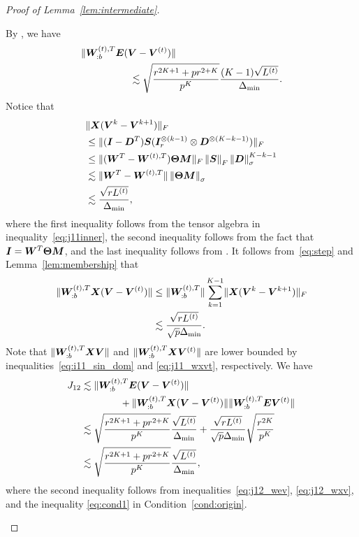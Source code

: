 \documentclass[journal]{IEEEtran}
\theoremstyle{definition}
\theoremstyle{definition}
\begin{document}
\begin{proof}[Proof of Lemma~\ref{lem:intermediate}]
\begin{enumerate}[wide]
    By \cite[Proof of Lemma 5]{han2020exact}, we have 
    \begin{align}
       & \onormSize{}{\mW_{:b}^{(t),T} \mE (\mV-\mV^{(t)})} \\
        & \quad \quad \quad \quad \quad \lesssim \sqrt{ \frac{r^{2K+1} + p r^{2 + K}}{p^K} } \frac{(K-1)\sqrt{L^{(t)}}}{\Delta_{\min}}. \label{eq:j12_wev}
    \end{align}
    Notice that 
    \begin{align}
        & \onormSize{}{\mX (\mV^k-\mV^{k+1})}_F \\ &\leq \onormSize{}{(\mI - \mD^T) \mS (\mI_r^{\otimes (k-1)} \otimes  \mD^{\otimes (K-k-1)})}_F\notag \\
        &\leq \onormSize{}{(\mW^T - \mW^{(t),T}) \mTheta \mM}_F \onorm{\mS}_F \onorm{ \mD}_{\sigma}^{K-k-1}\notag \\
        & \lesssim \onormSize{}{ \mW^T - \mW^{(t),T} } \onorm{\mTheta \mM}_{\sigma} \notag\\
        & \lesssim \frac{ \sqrt{r L^{(t)}}}{\Delta_{\min}}, \label{eq:step}
    \end{align}
    where the first inequality follows from the tensor algebra in 
    inequality~\eqref{eq:j11inner}, the second inequality follows from the fact  that $\bm I = \bm{W}^T \boldsymbol{\Theta} \bm M$, and the last inequality follows from \cite[Proof of Lemma 5]{han2020exact}. It follows from~\eqref{eq:step} and Lemma~\ref{lem:membership} that
    \small
    \begin{align}
        \onormSize{}{\mW_{:b}^{(t),T} \mX (\mV-\mV^{(t)})}&\leq \onormSize{}{\mW_{:b}^{(t),T} }  \sum_{k = 1}^{K-1} \onormSize{}{\mX (\mV^k-\mV^{k+1})}_F \\ &\lesssim \frac{ \sqrt{r L^{(t)}}}{\sqrt{p} \Delta_{\min}}.\label{eq:j12_wxv}
    \end{align}
    \normalsize
    Note that $\lVert\bm{W}_{:b}^{(t),T} \bm X \bm{V} \rVert$ and $\lVert\bm{W}_{:b}^{(t),T} \bm X \bm{V}^{(t)} \rVert$ are lower bounded by inequalities~\eqref{eq:i11_sin_dom} and \eqref{eq:j11_wxvt}, respectively. We have 
    \begin{align}
        J_{12} &\lesssim \lVert\bm{W}_{:b}^{(t),T} \bm{E} (\bm{V}-\bm{V}^{(t)})\rVert \\
        & \quad \quad \quad \quad + \lVert\bm{W}_{:b}^{(t),T} \bm X (\bm{V}-\bm{V}^{(t)})\rVert\lVert\bm{W}_{:b}^{(t),T} \bm{E} \bm{V}^{(t)} \rVert\\
        &\lesssim \sqrt{ \frac{r^{2K+1} + p r^{2 + K}}{p^K} } \frac{\sqrt{L^{(t)}}}{\Delta_{\min}} + \frac{ \sqrt{r L^{(t)}}}{\sqrt{p} \Delta_{\min}} \sqrt{\frac{r^{2K}}{p^K}} \\
        & \lesssim  \sqrt{ \frac{r^{2K+1} + p r^{2 + K}}{p^K} } \frac{\sqrt{L^{(t)}}}{\Delta_{\min}},
    \end{align}
    where the second inequality follows from inequalities~\eqref{eq:j12_wev}, \eqref{eq:j12_wxv}, and the inequality \eqref{eq:cond1} in Condition~\ref{cond:origin}.
    

\end{enumerate}
\end{proof}
\end{document}
